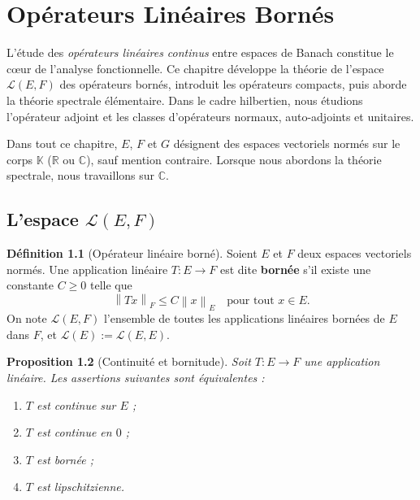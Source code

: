 \documentclass[a4paper,12pt]{book}
\newcommand{\R}{\mathbb{R}}
\newcommand{\C}{\mathbb{C}}
\newcommand{\K}{\mathbb{K}}
\newcommand{\norm}[1]{\left\| #1 \right\|}
\theoremstyle{definition}
\newtheorem{definition}{Définition}[chapter]
\theoremstyle{plain}
\newtheorem{proposition}[definition]{Proposition}
\theoremstyle{remark}
\begin{document}
\chapter{Opérateurs Linéaires Bornés}
\label{chap:operateurs-bornes}
\minitoc

\vspace{1em}

L'étude des \emph{opérateurs linéaires continus}
entre espaces de Banach constitue le c\oe ur de l'analyse fonctionnelle.
Ce chapitre développe la théorie de l'espace $\mathcal{L}(E,F)$
des opérateurs bornés, introduit les opérateurs compacts, puis
aborde la théorie spectrale élémentaire. Dans le cadre hilbertien,
nous étudions l'opérateur adjoint et les classes d'opérateurs
normaux, auto-adjoints et unitaires.

Dans tout ce chapitre, $E$, $F$ et $G$ désignent des espaces vectoriels normés sur
le corps $\K$ ($\R$ ou $\C$), sauf mention contraire. Lorsque nous abordons la théorie
spectrale, nous travaillons sur $\C$.

\section{L'espace \texorpdfstring{$\mathcal{L}(E,F)$}{L(E,F)}}
\label{sec:espace-LEF}


\begin{definition}[Opérateur linéaire borné]\label{def:operateur-borne}
Soient $E$ et $F$ deux espaces vectoriels normés. Une application linéaire
$T : E \to F$ est dite \textbf{bornée} s'il existe une constante $C \geq 0$ telle que
\[
    \norm{Tx}_F \leq C \norm{x}_E \quad \text{pour tout } x \in E.
\]
On note $\mathcal{L}(E,F)$ l'ensemble de toutes les applications linéaires bornées de
$E$ dans $F$, et $\mathcal{L}(E) := \mathcal{L}(E,E)$.
\end{definition}

\begin{proposition}[Continuité et bornitude]\label{prop:continu-borne}
Soit $T : E \to F$ une application linéaire. Les assertions suivantes sont équivalentes :
\begin{enumerate}[label=(\roman*)]
    \item $T$ est continue sur $E$ ;
    \item $T$ est continue en $0$ ;
    \item $T$ est bornée ;
    \item $T$ est lipschitzienne.
\end{enumerate}
\end{proposition}
\end{document}
